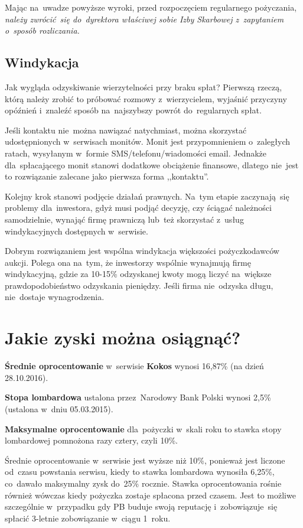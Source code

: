 \documentclass[a4paper,twoside,titlepage,openright]{book}
\begin{document}
Mając na~uwadze powyższe wyroki, przed rozpoczęciem regularnego pożyczania, \emph{należy zwrócić~się do~dyrektora właściwej sobie Izby Skarbowej z~zapytaniem o~sposób rozliczania.}\cite{oswiadczenieKokos}

\subsection*{Windykacja}

Jak wygląda odzyskiwanie wierzytelności przy braku spłat? Pierwszą rzeczą, którą należy zrobić to próbować rozmowy z~wierzycielem, wyjaśnić przyczyny opóźnień i~znaleźć sposób na~najszybszy powrót do~regularnych spłat. 

Jeśli kontaktu nie~można nawiązać natychmiast, można skorzystać udostępnionych w~serwisach monitów. Monit jest przypomnieniem o~zaległych ratach, wysyłanym w~formie SMS/telefonu/wiadomości email. Jednakże dla~spłacającego monit stanowi dodatkowe obciążenie finansowe, dlatego nie~jest to rozwiązanie zalecane jako pierwsza forma ,,kontaktu''. 

Kolejny krok stanowi podjęcie działań prawnych. Na~tym etapie zaczynają~się problemy dla~inwestora, gdyż musi podjąć decyzję, czy ściągać należności samodzielnie, wynająć firmę prawniczą lub~też skorzystać z~usług windykacyjnych dostępnych w~serwisie. 

Dobrym rozwiązaniem jest wspólna windykacja większości pożyczkodawców aukcji. Polega ona na~tym, że inwestorzy wspólnie wynajmują firmę windykacyjną, gdzie za 10-15\% odzyskanej kwoty mogą liczyć na~większe prawdopodobieństwo odzyskania pieniędzy. Jeśli firma nie~odzyska długu, nie~dostaje wynagrodzenia.


\section{Jakie zyski można osiągnąć?}

\textbf{Średnie oprocentowanie} w~serwisie \textbf{Kokos} wynosi 16,87\% \cite{zostanInwestorem} (na dzień 28.10.2016).

\textbf{Stopa lombardowa} ustalona przez~Narodowy Bank Polski wynosi 2,5\% \cite{stopy} (ustalona w~dniu 05.03.2015).
 
\textbf{Maksymalne oprocentowanie} dla~pożyczki w~skali roku to stawka stopy lombardowej pomnożona razy cztery, czyli 10\%.

Średnie oprocentowanie w~serwisie jest wyższe niż 10\%, ponieważ jest liczone od~czasu powstania serwisu, kiedy to stawka lombardowa wynosiła 6,25\%, co~dawało maksymalny zysk do~25\% rocznie. Stawka oprocentowania rośnie również wówczas kiedy pożyczka zostaje spłacona przed czasem. Jest to możliwe szczególnie w~przypadku gdy PB buduje swoją reputację i~zobowiązuje~się spłacić \mbox{3-letnie} zobowiązanie w~ciągu 1~roku. 
\end{document}
